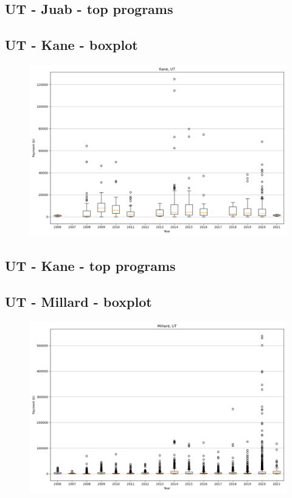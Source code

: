 \subsection*{UT - Juab - top programs}

\newpage
\subsection*{UT - Kane - boxplot}
\begin{figure}[h]
\centering
\includegraphics[width=7in]{../output/boxplots/counties/Kane-UT_boxplot.png}
\end{figure}


\subsection*{UT - Kane - top programs}

\newpage
\subsection*{UT - Millard - boxplot}
\begin{figure}[h]
\centering
\includegraphics[width=7in]{../output/boxplots/counties/Millard-UT_boxplot.png}
\end{figure}


